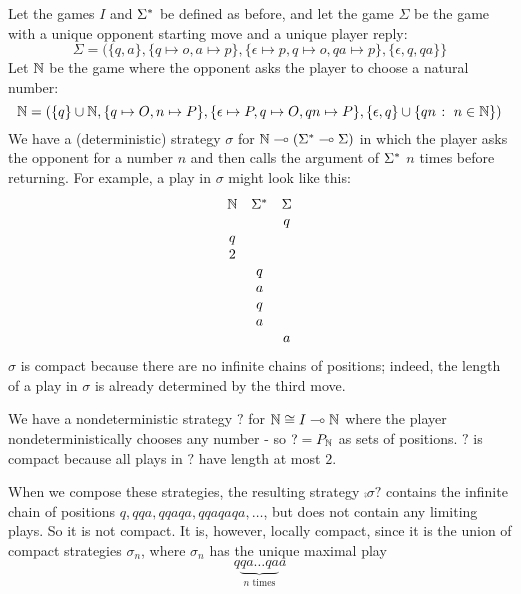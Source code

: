 \documentclass{article}
\begin{document}
\begin{example}
  Let the games $I$ and ${\Sigma^*}$ be defined as before, and let the game $\Sigma$ be the game with a unique opponent starting move and a unique player reply:
  \[
    \Sigma = (\{q,a\}, \{q\mapsto o, a\mapsto p\}, \{\epsilon\mapsto p,q\mapsto o,qa\mapsto p\}, \{\epsilon, q, qa\}\}
    \]
  Let $\mathbb{N}$ be the game where the opponent asks the player to choose a natural number:
  \[
    \mathbb{N} = \left(\{q\} \cup \mathbb{N}, \{q\mapsto O, n\mapsto P\}, \{\epsilon\mapsto P,q\mapsto O,qn\mapsto P\}, \{\epsilon, q\} \cup \{qn\;\colon\; n\in\mathbb{N}\}\right)
    \]
  We have a (deterministic) strategy $\sigma$ for $\mathbb{N}\multimap ({\Sigma^*}\multimap\Sigma)$ in which the player asks the opponent for a number $n$ and then calls the argument of ${\Sigma^*}$ $n$ times before returning.  For example, a play in $\sigma$ might look like this:
  \[
    \begin{array}{ccc}
      \mathbb{N} & {\Sigma^*} & \Sigma \\
      & & q \\
      q & & \\
      2 & & \\
      & q & \\
      & a & \\
      & q & \\
      & a & \\
      & & a
    \end{array}
    \]
  $\sigma$ is compact because there are no infinite chains of positions; indeed, the length of a play in $\sigma$ is already determined by the third move.  

  We have a nondeterministic strategy $?$ for $\mathbb{N}\cong I\multimap\mathbb{N}$ where the player nondeterministically chooses any number - so $? = P_{\mathbb{N}}$ as sets of positions.  $?$ is compact because all plays in $?$ have length at most $2$.  

  When we compose these strategies, the resulting strategy $\comp\sigma?$ contains the infinite chain of positions $q,qqa,qqaqa,qqaqaqa,\dots$, but does not contain any limiting plays.  So it is not compact.  It is, however, locally compact, since it is the union of compact strategies $\sigma_n$, where $\sigma_n$ has the unique maximal play
  \[
    q\underbrace{qa\dots qa}_{\textrm{$n$ times}}a
    \]
\end{example}
\end{document}
